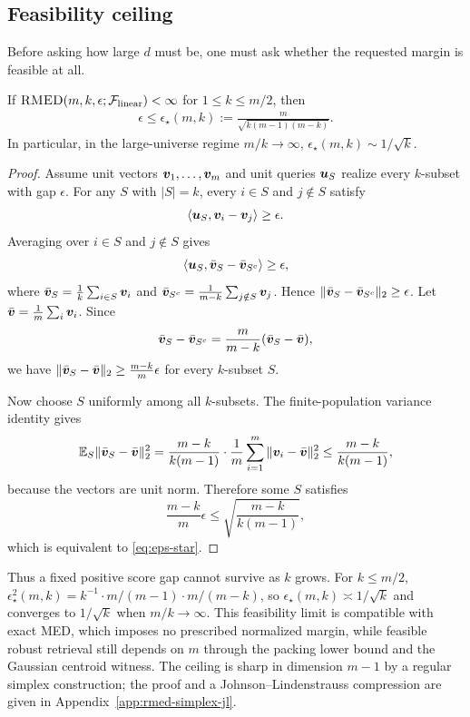 \documentclass{article}
\begin{document}
\subsection{Feasibility ceiling}

Before asking how large $d$ must be, one must ask whether the requested margin is feasible at all.

\begin{theorem}\label{thm:rmed-feasibility}
If $\textsc{RMED}(m,k,\epsilon;\mathcal{F}_{\rm linear})<\infty$ for $1\leq k\leq m/2$, then
\begin{align}
    \epsilon
    \leq
    \epsilon_\star(m,k)
    :=
    \frac{m}{\sqrt{k(m-1)(m-k)}}.
    \label{eq:eps-star}
\end{align}
In particular, in the large-universe regime $m/k\to\infty$, $\epsilon_\star(m,k)\sim 1/\sqrt{k}$.
\end{theorem}

\begin{proof}
Assume unit vectors $\bm{v}_1,\dots,\bm{v}_m$ and unit queries $\bm{u}_S$ realize every $k$-subset with gap $\epsilon$. For any $S$ with $|S|=k$, every $i\in S$ and $j\notin S$ satisfy
\[
    \langle \bm{u}_S,\bm{v}_i-\bm{v}_j\rangle\geq \epsilon.
\]
Averaging over $i\in S$ and $j\notin S$ gives
\[
    \left\langle \bm{u}_S,
    \bar{\bm{v}}_S-\bar{\bm{v}}_{S^c}
    \right\rangle\geq \epsilon,
\]
where $\bar{\bm{v}}_S=\frac{1}{k}\sum_{i\in S}\bm{v}_i$ and $\bar{\bm{v}}_{S^c}=\frac{1}{m-k}\sum_{j\notin S}\bm{v}_j$. Hence $\|\bar{\bm{v}}_S-\bar{\bm{v}}_{S^c}\|_2\geq \epsilon$.
Let $\bar{\bm{v}}=\frac{1}{m}\sum_i \bm{v}_i$. Since
\[
    \bar{\bm{v}}_S-\bar{\bm{v}}_{S^c}
    =
    \frac{m}{m-k}(\bar{\bm{v}}_S-\bar{\bm{v}}),
\]
we have $\|\bar{\bm{v}}_S-\bar{\bm{v}}\|_2\geq \frac{m-k}{m}\epsilon$ for every $k$-subset $S$.

Now choose $S$ uniformly among all $k$-subsets. The finite-population variance identity gives
\[
    \mathbb{E}_S\|\bar{\bm{v}}_S-\bar{\bm{v}}\|_2^2
    =
    \frac{m-k}{k(m-1)}
    \cdot
    \frac{1}{m}\sum_{i=1}^m \|\bm{v}_i-\bar{\bm{v}}\|_2^2
    \leq
    \frac{m-k}{k(m-1)},
\]
because the vectors are unit norm. Therefore some $S$ satisfies
\[
    \frac{m-k}{m}\epsilon
    \leq
    \sqrt{\frac{m-k}{k(m-1)}} ,
\]
which is equivalent to \eqref{eq:eps-star}.
\end{proof}

Thus a fixed positive score gap cannot survive as $k$ grows. For $k\leq m/2$, $\epsilon_\star^2(m,k)=k^{-1}\cdot m/(m-1)\cdot m/(m-k)$, so $\epsilon_\star(m,k)\asymp1/\sqrt{k}$ and converges to $1/\sqrt{k}$ when $m/k\to\infty$. This feasibility limit is compatible with exact MED, which imposes no prescribed normalized margin, while feasible robust retrieval still depends on $m$ through the packing lower bound and the Gaussian centroid witness. The ceiling is sharp in dimension $m-1$ by a regular simplex construction; the proof and a Johnson--Lindenstrauss compression are given in Appendix~\ref{app:rmed-simplex-jl}.
\end{document}
